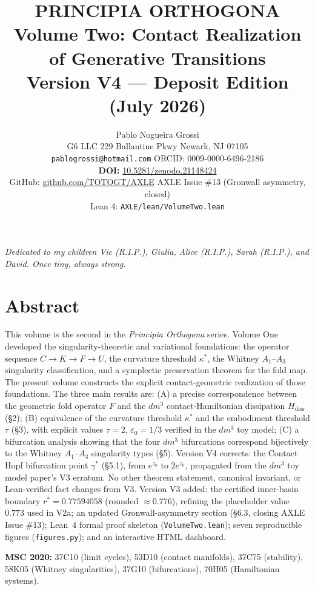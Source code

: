 \documentclass[11pt]{article}
\title{\textbf{PRINCIPIA ORTHOGONA}\\[0.3em]
Volume Two: Contact Realization of Generative Transitions\\[0.3em]
\large Version V4 --- Deposit Edition (July 2026)}
\author{Pablo Nogueira Grossi\\
G6 LLC \textperiodcentered{} 229 Ballantine Pkwy \textperiodcentered{} Newark, NJ 07105\\
\texttt{pablogrossi@hotmail.com} \textperiodcentered{} ORCID: 0009-0000-6496-2186\\
\textbf{DOI:} \href{https://doi.org/10.5281/zenodo.21148424}{10.5281/zenodo.21148424}\\
\small GitHub: \href{https://github.com/TOTOGT/AXLE}{github.com/TOTOGT/AXLE} \textperiodcentered{} AXLE Issue \#13 (Gronwall asymmetry, closed)\\
\small Lean 4: \texttt{AXLE/lean/VolumeTwo.lean}}
\date{}
\theoremstyle{boxed}
\begin{document}
\maketitle

\begin{center}\itshape
Dedicated to my children Vic (R.I.P.), Giulia, Alice (R.I.P.), Sarah (R.I.P.), and David. Once tiny, always strong.
\end{center}

\vspace{1em}

\section*{Abstract}

This volume is the second in the \emph{Principia Orthogona} series. Volume One developed
the singularity-theoretic and variational foundations: the operator sequence
$C \to K \to F \to U$, the curvature threshold $\kappa^{*}$, the Whitney $A_1$--$A_3$
singularity classification, and a symplectic preservation theorem for the fold map.
The present volume constructs the explicit contact-geometric realization of those
foundations. The three main results are:
(A) a precise correspondence between the geometric fold operator $F$ and the
$dm^3$ contact-Hamiltonian dissipation $H_{\mathrm{diss}}$ (\S 2);
(B) equivalence of the curvature threshold $\kappa^{*}$ and the embodiment
threshold $\tau$ (\S 3), with explicit values $\tau = 2$, $\varepsilon_0 = 1/3$
verified in the $dm^3$ toy model;
(C) a bifurcation analysis showing that the four $dm^3$ bifurcations correspond
bijectively to the Whitney $A_1$--$A_3$ singularity types (\S 5).
Version V4 corrects: the Contact Hopf bifurcation point $\gamma^{*}$ (\S 5.1),
from $e^{z_0}$ to $2e^{z_0}$, propagated from the $dm^3$ toy model paper's V3
erratum. No other theorem statement, canonical invariant, or Lean-verified
fact changes from V3. Version V3 added: the certified inner-basin boundary
$r^{*} = 0.77594058$ (rounded $\approx 0.776$), refining the placeholder value
$0.773$ used in V2a; an updated Gronwall-asymmetry section (\S 6.3, closing
AXLE Issue \#13); Lean~4 formal proof skeleton
(\texttt{VolumeTwo.lean}); seven reproducible figures (\texttt{figures.py});
and an interactive HTML dashboard.

\smallskip
\noindent\textbf{MSC 2020:} 37C10 (limit cycles), 53D10 (contact manifolds),
37C75 (stability), 58K05 (Whitney singularities), 37G10 (bifurcations), 70H05 (Hamiltonian systems).
\end{document}
